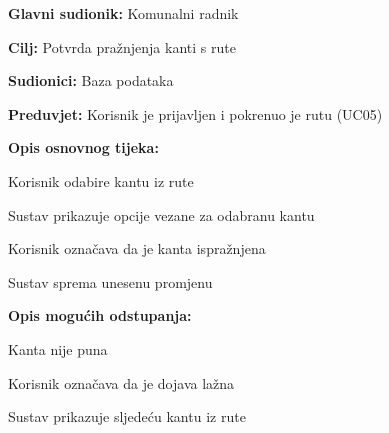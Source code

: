 	\noindent {}
					\begin{packed_item}
	
						\item \textbf{Glavni sudionik: }Komunalni radnik
						\item  \textbf{Cilj:} Potvrda pražnjenja kanti s rute
						\item  \textbf{Sudionici:} Baza podataka
						\item  \textbf{Preduvjet:} Korisnik je prijavljen i pokrenuo je rutu (UC05)
						\item  \textbf{Opis osnovnog tijeka:}
						
						\item[] \begin{packed_enum}
	
							\item Korisnik odabire kantu iz rute
							\item Sustav prikazuje opcije vezane za odabranu kantu
							\item Korisnik označava da je kanta ispražnjena
							\item Sustav sprema unesenu promjenu
							
						\end{packed_enum}
						
						\item  \textbf{Opis mogućih odstupanja:}
						
						\item[] \begin{packed_item}
	
							\item[3.a] Kanta nije puna
							
							\item[] \begin{packed_enum}
								
								\item Korisnik označava da je dojava lažna
								\item Sustav prikazuje sljedeću kantu iz rute
								
							\end{packed_enum}
						\end{packed_item}
					\end{packed_item}

